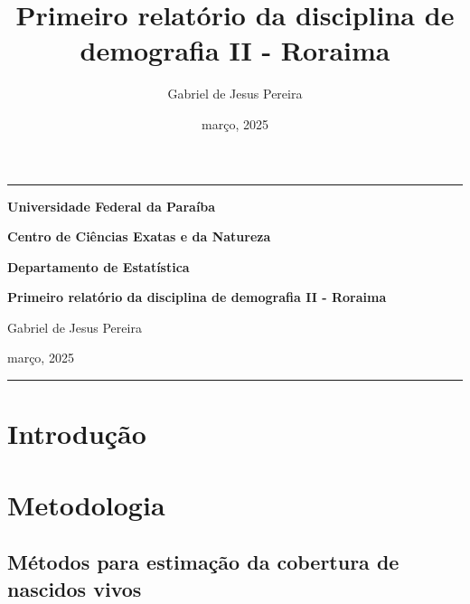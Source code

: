 \documentclass[
  12pt,
  a4paper,
]{scrreprt}
\title{Primeiro relatório da disciplina de demografia II - Roraima}
\author{Gabriel de Jesus Pereira}
\date{março, 2025}
\renewcommand*\contentsname{Índice}
\newcommand\contentsname{Índice}
\begin{document}
\cleardoublepage
\thispagestyle{empty}
{\centering
\noindent\rule{\textwidth}{0.5pt}

\vspace{2ex}

{\Large\bfseries Universidade Federal da Paraíba \par}
\vspace{1ex}
{\Large\bfseries Centro de Ciências Exatas e da Natureza \par}
\vspace{1ex}
{\Large\bfseries Departamento de Estatística \par}

\vfill

{\large\bfseries Primeiro relatório da disciplina de demografia II -
Roraima \par}

\vfill

{\large Gabriel de Jesus Pereira \par}
\vfill
{\normalsize março, 2025 \par}


\noindent\rule{\textwidth}{0.5pt}

}
\renewcommand*\contentsname{\centering Sumário \thispagestyle{empty}}
{
\hypersetup{linkcolor=}
\setcounter{tocdepth}{2}
\tableofcontents
}

\pagestyle{fancy}

\fancyhf{}
\fancyhead[RO, LE]{\thepage}
\fancyhead[LO]{\leftmark}
\fancyhead[RE]{\thepage}


\chapter{Introdução}\label{introduuxe7uxe3o}

\chapter{Metodologia}\label{metodologia}

\section{Métodos para estimação da cobertura de nascidos
vivos}\label{muxe9todos-para-estimauxe7uxe3o-da-cobertura-de-nascidos-vivos}
\end{document}
